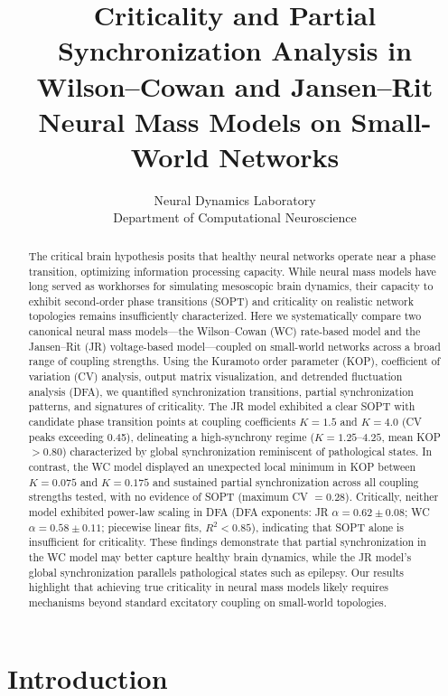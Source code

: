 \documentclass[11pt]{article}
\title{Criticality and Partial Synchronization Analysis in Wilson--Cowan and Jansen--Rit Neural Mass Models on Small-World Networks}
\author{
Neural Dynamics Laboratory\\
Department of Computational Neuroscience\\
}
\date{}
\begin{document}
\maketitle

\begin{abstract}
The critical brain hypothesis posits that healthy neural networks operate near a phase transition, optimizing information processing capacity. While neural mass models have long served as workhorses for simulating mesoscopic brain dynamics, their capacity to exhibit second-order phase transitions (SOPT) and criticality on realistic network topologies remains insufficiently characterized. Here we systematically compare two canonical neural mass models---the Wilson--Cowan (WC) rate-based model and the Jansen--Rit (JR) voltage-based model---coupled on small-world networks across a broad range of coupling strengths. Using the Kuramoto order parameter (KOP), coefficient of variation (CV) analysis, output matrix visualization, and detrended fluctuation analysis (DFA), we quantified synchronization transitions, partial synchronization patterns, and signatures of criticality. The JR model exhibited a clear SOPT with candidate phase transition points at coupling coefficients $K = 1.5$ and $K = 4.0$ (CV peaks exceeding 0.45), delineating a high-synchrony regime ($K = 1.25$--$4.25$, mean KOP $> 0.80$) characterized by global synchronization reminiscent of pathological states. In contrast, the WC model displayed an unexpected local minimum in KOP between $K = 0.075$ and $K = 0.175$ and sustained partial synchronization across all coupling strengths tested, with no evidence of SOPT (maximum CV $= 0.28$). Critically, neither model exhibited power-law scaling in DFA (DFA exponents: JR $\alpha = 0.62 \pm 0.08$; WC $\alpha = 0.58 \pm 0.11$; piecewise linear fits, $R^2 < 0.85$), indicating that SOPT alone is insufficient for criticality. These findings demonstrate that partial synchronization in the WC model may better capture healthy brain dynamics, while the JR model's global synchronization parallels pathological states such as epilepsy. Our results highlight that achieving true criticality in neural mass models likely requires mechanisms beyond standard excitatory coupling on small-world topologies.
\end{abstract}

\section{Introduction}
\end{document}
